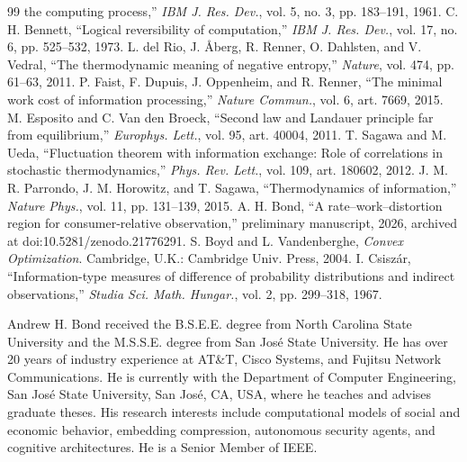 \documentclass[11pt,onecolumn]{IEEEtran}
\begin{document}
\begin{thebibliography}{99}
the computing process,'' \emph{IBM J. Res. Dev.}, vol. 5, no. 3, pp. 183--191,
1961.
 C. H. Bennett, ``Logical reversibility of computation,''
\emph{IBM J. Res. Dev.}, vol. 17, no. 6, pp. 525--532, 1973.
 L. del Rio, J. \AA berg, R. Renner, O. Dahlsten, and
V. Vedral, ``The thermodynamic meaning of negative entropy,'' \emph{Nature},
vol. 474, pp. 61--63, 2011.
 P. Faist, F. Dupuis, J. Oppenheim, and R. Renner, ``The
minimal work cost of information processing,'' \emph{Nature Commun.}, vol. 6,
art. 7669, 2015.
 M. Esposito and C. Van den Broeck, ``Second law and
Landauer principle far from equilibrium,'' \emph{Europhys. Lett.}, vol. 95,
art. 40004, 2011.
 T. Sagawa and M. Ueda, ``Fluctuation theorem with
information exchange: Role of correlations in stochastic thermodynamics,''
\emph{Phys. Rev. Lett.}, vol. 109, art. 180602, 2012.
 J. M. R. Parrondo, J. M. Horowitz, and T. Sagawa,
``Thermodynamics of information,'' \emph{Nature Phys.}, vol. 11,
pp. 131--139, 2015.
 A. H. Bond, ``A rate--work--distortion region for
consumer-relative observation,'' preliminary manuscript, 2026, archived at
doi:10.5281/zenodo.21776291.
 S. Boyd and L. Vandenberghe, \emph{Convex Optimization}.
Cambridge, U.K.: Cambridge Univ. Press, 2004.
 I. Csisz\'ar, ``Information-type measures of difference
of probability distributions and indirect observations,'' \emph{Studia Sci.
Math. Hungar.}, vol. 2, pp. 299--318, 1967.
\end{thebibliography}

\begin{IEEEbiographynophoto}{Andrew H. Bond}
received the B.S.E.E. degree from North Carolina State University and the M.S.S.E. degree from San Jos\'{e} State University. He has over 20 years of industry experience at AT\&T, Cisco Systems, and Fujitsu Network Communications. He is currently with the Department of Computer Engineering, San Jos\'{e} State University, San Jos\'{e}, CA, USA, where he teaches and advises graduate theses. His research interests include computational models of social and economic behavior, embedding compression, autonomous security agents, and cognitive architectures. He is a Senior Member of IEEE.
\end{IEEEbiographynophoto}
\end{document}
